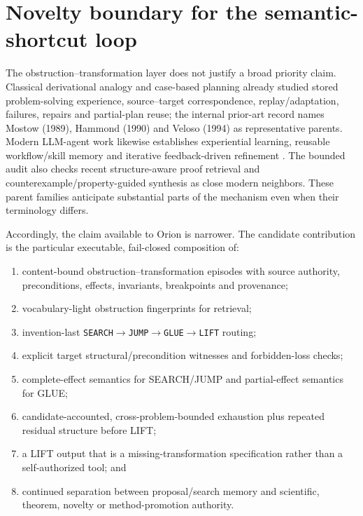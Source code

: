 \section{Novelty boundary for the semantic-shortcut loop}
\label{sec:semantic-shortcut-novelty}

The obstruction--transformation layer does not justify a broad priority claim. Classical derivational analogy and case-based planning already studied stored problem-solving experience, source--target correspondence, replay/adaptation, failures, repairs and partial-plan reuse; the internal prior-art record names Mostow (1989), Hammond (1990) and Veloso (1994) as representative parents. Modern LLM-agent work likewise establishes experiential learning, reusable workflow/skill memory and iterative feedback-driven refinement \cite{shinn2023reflexion,zhao2023expel,wang2024awm,wang2026autoskills,zhang2026memskill}. The bounded audit also checks recent structure-aware proof retrieval and counterexample/property-guided synthesis as close modern neighbors. These parent families anticipate substantial parts of the mechanism even when their terminology differs.

Accordingly, the claim available to Orion is narrower. The candidate contribution is the particular executable, fail-closed composition of:
\begin{enumerate}[leftmargin=*]
\item content-bound obstruction--transformation episodes with source authority, preconditions, effects, invariants, breakpoints and provenance;
\item vocabulary-light obstruction fingerprints for retrieval;
\item invention-last \texttt{SEARCH}$\rightarrow$\texttt{JUMP}$\rightarrow$\texttt{GLUE}$\rightarrow$\texttt{LIFT} routing;
\item explicit target structural/precondition witnesses and forbidden-loss checks;
\item complete-effect semantics for SEARCH/JUMP and partial-effect semantics for GLUE;
\item candidate-accounted, cross-problem-bounded exhaustion plus repeated residual structure before LIFT;
\item a LIFT output that is a missing-transformation specification rather than a self-authorized tool; and
\item continued separation between proposal/search memory and scientific, theorem, novelty or method-promotion authority.
\end{enumerate}

